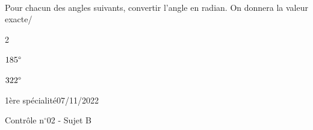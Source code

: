 \documentclass[a4paper,12pt]{article}        %
\begin{document}
\\
Pour chacun des angles suivants, convertir l'angle en radian. On donnera la valeur exacte/
\begin{multicols}{2}
	\begin{enumMet}
		\item $185\degree$
		\item $322\degree$
	\end{enumMet}
\end{multicols}


\newpage
\vspace*{-1.5cm}
1ère spécialité\phantom{xxxxxxxxxxxxxxxxxxxxxxxxxxxxxxxxxxxxxxxxxxxxxxxxxxxxxxxxxxxxxxx}07/11/2022
{\begin{center}\Huge{Contrôle n$^{\circ}$02 - Sujet B}\end{center}}

\setcounter{exo}{1}
\end{document}
